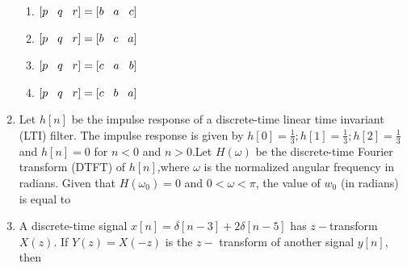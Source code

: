 \documentclass[journal,12pt,twocolumn]{IEEEtran}
\begin{document}
\begin{enumerate}
\begin{enumerate}
\item $[p\hspace{3mm}q\hspace{3mm}r]=[b\hspace{3mm}a\hspace{3mm}c]$
\item $[p\hspace{3mm}q\hspace{3mm}r]=[b\hspace{3mm}c\hspace{3mm}a]$
\item $[p\hspace{3mm}q\hspace{3mm}r]=[c\hspace{3mm}a\hspace{3mm}b]$
\item $[p\hspace{3mm}q\hspace{3mm}r]=[c\hspace{3mm}b\hspace{3mm}a]$
\end{enumerate}

\item Let $h[n]$ be the impulse response of a discrete-time linear time invariant (LTI) filter. The impulse response is given by $h[0]=\frac{1}{3};h[1]=\frac{1}{3};h[2]=\frac{1}{3}$ and $h[n]=0$ for $n<0$ and $n>0$.\newline Let $H(\omega)$ be the discrete-time Fourier transform (DTFT) of $h[n]$,where $\omega$ is the normalized angular frequency in radians. Given that $H(\omega_0)=0$ and $0<\omega < \pi$, the value of $w_0$ (in radians) is equal to \underline{\hspace{2cm}}


\item A discrete-time signal $x[n]=\delta[n-3]+2\delta[n-5]$ has $z-$transform $X(z)$. If $Y(z)=X(-z)$ is the $z-$ transform of another signal $y[n]$, then

\begin{enumerate}[(A)]
\end{enumerate}


\end{enumerate}
\end{document}
